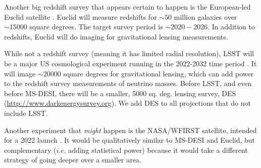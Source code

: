 Another big redshift survey that appears certain to happen is the 
European-led Euclid satellite \cite{2012SPIE.8442E..0ZA}. 
Euclid will measure redshifts for 
$\sim 50$ million galaxies over $\sim 15000$ square degrees.  
The target survey period is $\sim 2020-2026$. In addition to redshifts, 
Euclid will do imaging for gravitational lensing measurements.

While not a redshift survey (meaning it has limited radial resolution), LSST
will be a major US cosmological experiment running in the 2022-2032 time 
period \cite{2009arXiv0912.0201L}.
It will image $\sim 20000$ square degrees for gravitational lensing,
which can add  power 
to the redshift survey measurements of neutrino masses.
Before LSST, and even before MS-DESI, there will be a smaller, 5000 sq. deg.
lensing survey, DES
(\url{http://www.darkenergysurvey.org}). 
We add DES to all projections that do not include LSST. 

Another experiment that {\em might} happen is the NASA/WFIRST satellite, 
intended for a 2022 launch \cite{2012arXiv1208.4012G}. 
It would be qualitatively similar to MS-DESI and
Euclid, but complementary ($i.e.$ adding statistical power) because it would
take a different strategy of going deeper over a smaller area.    


